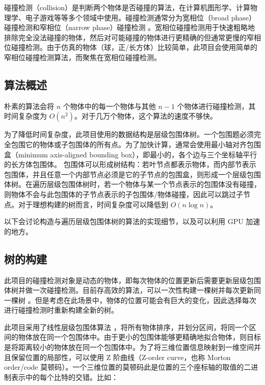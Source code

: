 碰撞检测（collision）是判断两个物体是否碰撞的算法，在计算机图形学、计算物理学、电子游戏等等多个领域中使用。碰撞检测通常分为宽相位（broad phase）碰撞检测和窄相位（narrow phase）碰撞检测 \cite{nvidiaCollisionDetection}。宽相位碰撞检测用于快速粗略地排除完全没法碰撞的物体，然后对可能碰撞的物体进行更精确的但通常更慢的窄相位碰撞检测。由于仿真的物体（球，正/长方体）比较简单，此项目会使用简单的窄相位碰撞检测算法，而聚焦在宽相位碰撞检测。

\subsection{算法概述}

朴素的算法会将 $n$ 个物体中的每一个物体与其他 $n-1$ 个物体进行碰撞检测，其时间复杂度为 $O(n^2)$。对于几万个物体，这个算法的速度不够快。

为了降低时间复杂度，此项目使用的数据结构是层级包围体树。一个包围题必须完全包围它的物体或子包围体的所有点。为了加快计算，通常会使用最小轴对齐包围盒（minimum axis-aligned bounding box），即最小的，各个边与三个坐标轴平行的长方体包围体。
包围体可以形成树结构：若叶节点都表示物体，而内部节表示包围体，并且任意一个内部节点必须是它的子节点的包围盒，则形成一个层级包围体树。在遍历层级包围体树时，若一个物体与某一个节点表示的包围体没有碰撞，则物体不会与此包围体的子节点表示的子包围体/物体碰撞，因此可以跳过子节点。对于理想构建的树而言，时间复杂度可以降低到 $O(n\log n)$。

以下会讨论构造与遍历层级包围体树的算法的实现细节，以及可以利用 GPU 加速的地方。

\subsection{树的构建}

此项目的碰撞检测对象是动态的物体，即每次物体的位置更新后需要更新层级包围体树并做一次碰撞检测。目前存高效的算法，可以一次性构建一棵树并每次更新同一棵树 \cite{Wald2008}。但是考虑在此场景中，物体的位置可能会有巨大的变化，因此选择每次进行碰撞检测时重新构建全新的树。

此项目采用了线性层级包围体算法 \cite{nvidiaTreeConstruction} \cite{Lauterbach2009}，将所有物体排序，并划分区间，将同一个区间的物体放在同一个包围体中。由于更小的包围体能够更精确地拟合物体，则目标是将距离较小的物体放在同一个包围体中。为了将三维位置信息映射到一维空间并且保留位置的局部性，可以使用 Z 阶曲线（Z-order curve，也称 Morton order/code 莫顿码）\cite{wikipediaZorderCurve}。一个三维位置的莫顿码此是位置的三个座标轴的取值的二进制表示中的每个比特的交错。比如：

